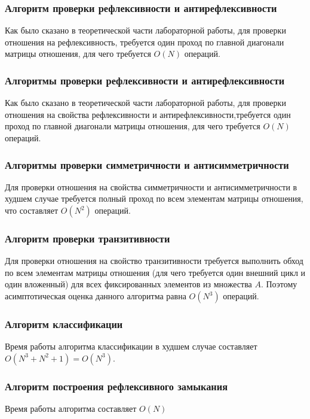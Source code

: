 \documentclass[bachelor, och, labwork]{shiza}
\begin{document}
    \subsubsection{Алгоритм проверки рефлексивности и антирефлексивности}

    Как было сказано в теоретической части лабораторной работы, для проверки 
    отношения на рефлексивность, требуется один проход по главной диагонали
    матрицы отношения, для чего требуется $O(N)$ операций.

    \subsubsection{Алгоритмы проверки рефлексивности и антирефлексивности}

    Как было сказано в теоретической части лабораторной работы, для проверки 
    отношения на свойства рефлексивности и антирефлексивности,требуется один 
    проход по главной диагонали матрицы отношения, для чего требуется $O(N)$ 
    операций.

    \subsubsection{Алгоритмы проверки симметричности и антисимметричности}
    Для проверки отношения на свойства симметричности и антисимметричности 
    в худшем случае требуется полный проход по всем элементам матрицы
    отношения, что составляет $O(N^2)$ операций.

    \subsubsection{Алгоритм проверки транзитивности}
    Для проверки отношения на свойство транзитивности требуется выполнить обход 
    по всем элементам матрицы отношения (для чего требуется один внешний цикл 
    и один вложенный) для всех фиксированных элементов из множества $A$.
    Поэтому асимптотическая оценка данного алгоритма равна $O(N^3)$ операций.

    \subsubsection{Алгоритм классификации}
    Время работы алгоритма классификации в худшем случае составляет 
    $O(N^3 + N^2 + 1)=O(N^3)$.
    

    \subsubsection{Алгоритм построения рефлексивного замыкания}
    Время работы алгоритма составляет $O(N)$
\end{document}
